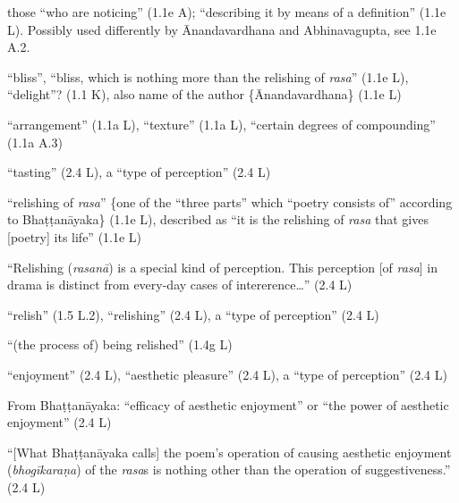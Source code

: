 \documentclass[10pt]{article}
\begin{document}
\begin{multicols}{2}
\begin{enumerate}[
			leftmargin=0em,
			rightmargin=0em,
		]
		 those ``who are noticing'' (1.1e A); ``describing it by means of a definition'' (1.1e L). Possibly used differently by Ānandavardhana and Abhinavagupta, see 1.1e A.2.

		 ``bliss'', ``bliss, which is nothing more than the relishing of \textit{rasa}'' (1.1e L), ``delight''? (1.1 K), also name of the author \{Ānandavardhana\} (1.1e L)
		
		 ``arrangement'' (1.1a L), ``texture'' (1.1a L), ``certain degrees of compounding'' (1.1a A.3)



		 ``tasting'' (2.4 L),
		a ``type of perception'' (2.4 L)

		 ``relishing of \textit{rasa}'' \{one of the ``three parts'' which ``poetry consists of'' according to Bhaṭṭanāyaka\} (1.1e L),
		described as ``it is the relishing of \textit{rasa} that gives [poetry] its life'' (1.1e L)

		 ``Relishing (\textit{rasanā}) is a special kind of perception. This perception [of \textit{rasa}] in drama is distinct from every-day cases of intererence\dots'' (2.4 L)

		 ``relish'' (1.5 L.2),
		``relishing'' (2.4 L),
		a ``type of perception'' (2.4 L)

		 ``(the process of) being relished'' (1.4g L)

		 ``enjoyment'' (2.4 L),
		``aesthetic pleasure'' (2.4 L),
		a ``type of perception'' (2.4 L)

		 From Bhaṭṭanāyaka: ``efficacy of aesthetic enjoyment'' or ``the power of aesthetic enjoyment'' (2.4 L) %

		 ``[What Bhaṭṭanāyaka calls] the poem's operation of causing aesthetic enjoyment (\textit{bhogīkaraṇa}) of the \textit{rasa}s is nothing other than the operation of suggestiveness.'' (2.4 L)


\end{enumerate}
\end{multicols}
\end{document}
